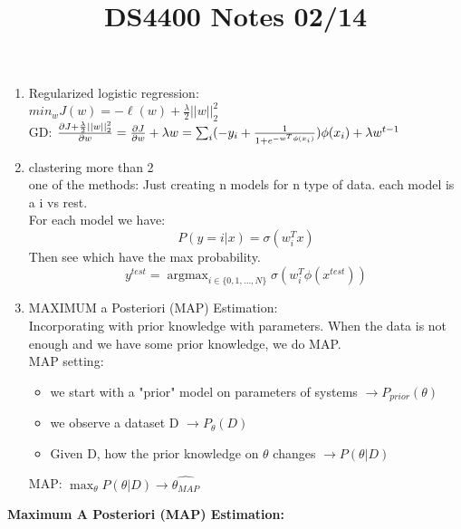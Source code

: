 \documentclass[12pt]{article}
\DeclareMathOperator*{\argmax}{\arg\max}
\begin{document}
\begin{enumerate}
            \item Regularized logistic regression:\\
            $min_w J(w) = -\ell(w) + \frac{\lambda}{2}||w||_2^2$ \\
            GD: $\frac{\partial J + \frac{\lambda}{2}||w||_2^2}{\partial w} = \frac{\partial J}{\partial w} + \lambda w\\
            = \sum_i (-y_i + \frac{1}{1 + e^{-w^T\phi(x_i)}})\phi(x_i) + \lambda w^{t-1}$

            \item clastering more than 2\\
            one of the methods: Just creating n models for n type of data. each model is a i vs rest.\\
            For each model we have:
            $$P(y = i | x) = \sigma(w_i^T x)$$
            Then see which have the max probability.
            $$y^{test} = \argmax_{i \in \{0,1,\dots, N\}} \sigma (w^T_i \phi(x^{test}))$$

            \item MAXIMUM a Posteriori (MAP) Estimation:\\
            Incorporating with prior knowledge with parameters. When the data is not enough and we have some prior knowledge, we do MAP.\\
            MAP setting: 
            \begin{itemize}
                \item we start with a "prior" model on parameters of systems $\rightarrow P_{prior}(\theta)$
                \item we observe a dataset D $\rightarrow P_\theta(D)$
                \item Given D, how the prior knowledge on $\theta$ changes $\rightarrow P(\theta | D)$
            \end{itemize}
            MAP: $\max_\theta P(\theta | D) \rightarrow \hat{\theta_{MAP}}$
        \end{enumerate}
        \title{DS4400 Notes 02/14}
        \maketitle

        \textbf{Maximum A Posteriori (MAP) Estimation:}
        
\end{document}
